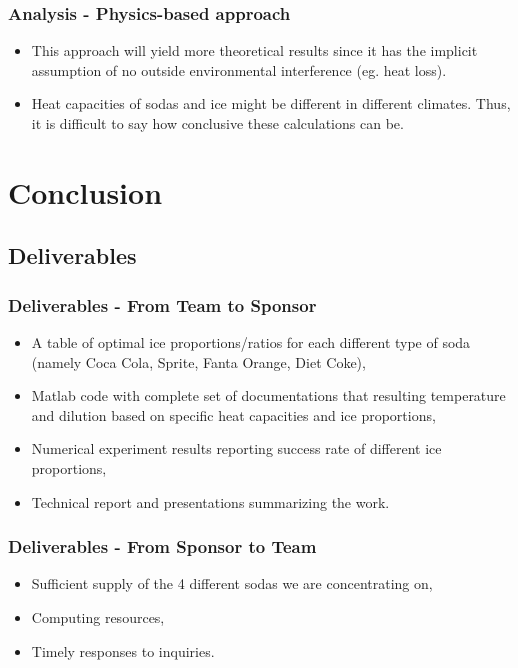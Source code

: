 \documentclass[compress,handout,10pt]{beamer}
\let\olditem\item
\renewcommand{\item}{\setlength{\itemsep}{0.5\baselineskip}\olditem}
\begin{document}
\begin{frame}
    \frametitle{Analysis - Physics-based approach}
\begin{itemize}
\item This approach will yield more theoretical results since it has the implicit assumption of no outside environmental interference (eg. heat loss).
\item Heat capacities of sodas and ice might be different in different climates. Thus, it is difficult to say how conclusive these calculations can be.
\end{itemize}
\end{frame}

\section{Conclusion}
\subsection{Deliverables}
\begin{frame}
    \frametitle{Deliverables - From Team to Sponsor}
\begin{itemize}
    \item A table of optimal ice proportions/ratios for each different type of soda (namely Coca Cola, Sprite, Fanta Orange, Diet Coke),
    \item Matlab code with complete set of documentations that resulting temperature and dilution based on specific heat capacities and ice proportions,
    \item Numerical experiment results reporting success rate of different ice proportions,
    \item Technical report and presentations summarizing the work. 
\end{itemize}


\end{frame}

\begin{frame}
    \frametitle{Deliverables - From Sponsor to Team}

\begin{itemize}
    \item Sufficient supply of the 4 different sodas we are concentrating on,
    \item Computing resources,
    \item Timely responses to inquiries.
\end{itemize}
\end{frame}
\end{document}
